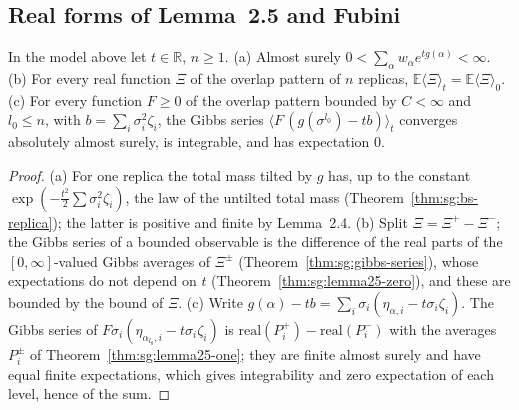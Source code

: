 \subsection*{Real forms of Lemma~2.5 and Fubini}

\begin{theorem}[Lemma~2.5 for $k=0$ and $k=(1,0,\dots,0)$ in real form]\label{thm:sg:lemma25-real}
  \leanok
In the model above let $t\in\mathbb R$, $n\ge1$.
(a) Almost surely $0<\sum_\alpha w_\alpha e^{tg(\alpha)}<\infty$.
(b) For every real function $\Xi$ of the overlap pattern of $n$ replicas, $\mathbb E\langle\Xi\rangle_t=\mathbb E\langle\Xi\rangle_0$.
(c) For every function $F\ge0$ of the overlap pattern bounded by $C<\infty$ and $l_0\le n$, with $b=\sum_i\sigma_i^2\zeta_i$, the Gibbs series
$\langle F\,(g(\sigma^{l_0})-tb)\rangle_t$ converges absolutely almost surely, is integrable, and has expectation $0$.
\end{theorem}
\begin{proof}
  \leanok
(a) For one replica the total mass tilted by $g$ has, up to the constant $\exp(-\tfrac{t^2}2\sum\sigma_i^2\zeta_i)$, the law of the untilted total mass (Theorem~\ref{thm:sg:bs-replica}); the latter is positive and finite by Lemma~2.4.
(b) Split $\Xi=\Xi^+-\Xi^-$; the Gibbs series of a bounded observable is the difference of the real parts of the $[0,\infty]$-valued Gibbs averages of $\Xi^\pm$ (Theorem~\ref{thm:sg:gibbs-series}), whose expectations do not depend on $t$ (Theorem~\ref{thm:sg:lemma25-zero}),
and these are bounded by the bound of $\Xi$.
(c) Write $g(\alpha)-tb=\sum_i\sigma_i(\eta_{\alpha,i}-t\sigma_i\zeta_i)$. The Gibbs series of $F\sigma_i(\eta_{\alpha_{l_0},i}-t\sigma_i\zeta_i)$ is $\mathrm{real}(P_i^+)-\mathrm{real}(P_i^-)$ with the averages $P_i^\pm$ of
Theorem~\ref{thm:sg:lemma25-one}; they are finite almost surely and have equal finite expectations, which gives integrability and zero expectation of each level, hence of the sum.
\end{proof}

